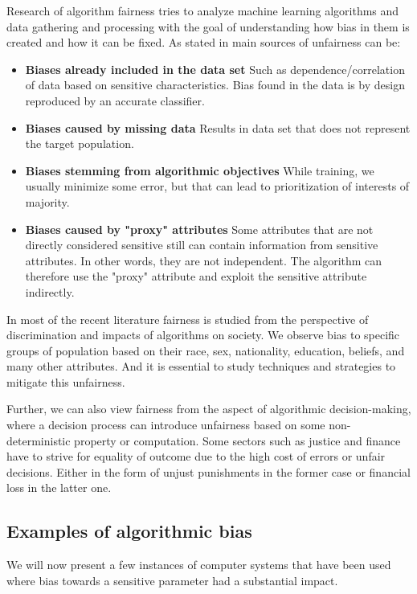Research of algorithm fairness tries to analyze machine learning algorithms and data gathering and processing with the goal of understanding how bias in them is created and how it can be fixed.
\newline
As stated in \cite{pessach2020algorithmic_fairness} main sources of unfairness can be:
\begin{itemize}
    \item \textbf{Biases already included in the data set}\newline
    Such as dependence/correlation of data based on sensitive characteristics. Bias found in the data is by design reproduced by an accurate classifier.
    \item \textbf{Biases caused by missing data}\newline
    Results in data set that does not represent the target population.
    \item \textbf{Biases stemming from algorithmic objectives}\newline
    While training, we usually minimize some error, but that can lead to prioritization of interests of majority.
    \item \textbf{Biases caused by "proxy" attributes}\newline
    Some attributes that are not directly considered sensitive still can contain information from sensitive attributes. In other words, they are not independent. The algorithm can therefore use the "proxy" attribute and exploit the sensitive attribute indirectly.
\end{itemize}


In most of the recent literature fairness is studied from the perspective of discrimination and impacts of algorithms on society. We observe bias to specific groups of population based on their race, sex, nationality, education, beliefs, and many other attributes. And it is essential to study techniques and strategies to mitigate this unfairness.

Further, we can also view fairness from the aspect of algorithmic decision-making, where a decision process can introduce unfairness based on some non-deterministic property or computation. Some sectors such as justice and finance have to strive for equality of outcome due to the high cost of errors or unfair decisions. Either in the form of unjust punishments in the former case or financial loss in the latter one.


\subsection{Examples of algorithmic bias}
We will now present a few instances of computer systems that have been used where bias towards a sensitive parameter had a substantial impact.

